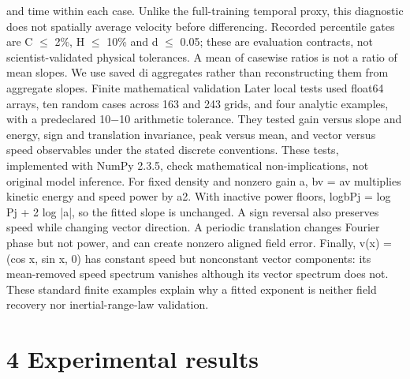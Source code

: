 \documentclass[11pt]{article}
\begin{document}
and time within each case. Unlike the full-training temporal proxy, this diagnostic does not spatially
average velocity before differencing. Recorded percentile gates are C \ensuremath{\leq} 2\%, H \ensuremath{\leq} 10\% and d \ensuremath{\leq} 0.05;
these are evaluation contracts, not scientist-validated physical tolerances. A mean of casewise ratios
is not a ratio of mean slopes. We use saved di aggregates rather than reconstructing them from
aggregate slopes.
Finite mathematical validation
Later local tests used float64 arrays, ten random cases across 163 and 243 grids, and four analytic
examples, with a predeclared 10\ensuremath{-}10 arithmetic tolerance. They tested gain versus slope and energy,
sign and translation invariance, peak versus mean, and vector versus speed observables under the
stated discrete conventions. These tests, implemented with NumPy 2.3.5, check mathematical
non-implications, not original model inference.
For fixed density and nonzero gain a, bv = av multiplies kinetic energy and speed power by
a2. With inactive power floors, logbPj = log Pj + 2 log |a|, so the fitted slope is unchanged. A sign
reversal also preserves speed while changing vector direction. A periodic translation changes Fourier
phase but not power, and can create nonzero aligned field error. Finally, v(x) = (cos x, sin x, 0)
has constant speed but nonconstant vector components: its mean-removed speed spectrum vanishes
although its vector spectrum does not. These standard finite examples explain why a fitted exponent
is neither field recovery nor inertial-range-law validation.

\section*{4 Experimental results}
\end{document}
